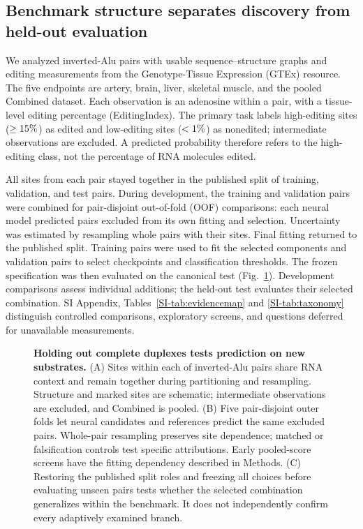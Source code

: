 \documentclass[9pt,twocolumn,twoside]{pnas-new}
\newcommand{\SIref}[1]{\ref*{SI-#1}}
\begin{document}
\subsection*{Benchmark structure separates discovery from held-out evaluation}

We analyzed \NSubstrates{} inverted-Alu pairs with usable sequence--structure graphs and editing measurements from the Genotype-Tissue Expression (GTEx) resource. The five endpoints are artery, brain, liver, skeletal muscle, and the pooled Combined dataset. Each observation is an adenosine within a pair, with a tissue-level editing percentage (EditingIndex). The primary task labels high-editing sites ($\geq15{}\%$) as edited and low-editing sites ($<1{}\%$) as nonedited; intermediate observations are excluded. A predicted probability therefore refers to the high-editing class, not the percentage of RNA molecules edited.

All sites from each pair stayed together in the published split of \NTrainPairs{} training, \NValidationPairs{} validation, and \NTestPairs{} test pairs. During development, the training and validation pairs were combined for pair-disjoint out-of-fold (OOF) comparisons: each neural model predicted pairs excluded from its own fitting and selection. Uncertainty was estimated by resampling whole pairs with their sites. Final fitting returned to the published split. Training pairs were used to fit the selected components and validation pairs to select checkpoints and classification thresholds. The frozen specification was then evaluated on the canonical test (Fig.~\ref{fig:overview}). Development comparisons assess individual additions; the held-out test evaluates their selected combination. SI Appendix, Tables~\SIref{tab:evidencemap} and \SIref{tab:taxonomy} distinguish controlled comparisons, exploratory screens, and questions deferred for unavailable measurements.

\begin{figure}[t!]
\centering

\caption{\textbf{Holding out complete duplexes tests prediction on new substrates.} (A) Sites within each of \NSubstrates{} inverted-Alu pairs share RNA context and remain together during partitioning and resampling. Structure and marked sites are schematic; intermediate observations are excluded, and Combined is pooled. (B) Five pair-disjoint outer folds let neural candidates and references predict the same excluded pairs. Whole-pair resampling preserves site dependence; matched or falsification controls test specific attributions. Early pooled-score screens have the fitting dependency described in Methods. (C) Restoring the published split roles and freezing all choices before evaluating \NTestPairs{} unseen pairs tests whether the selected combination generalizes within the benchmark. It does not independently confirm every adaptively examined branch.}
\label{fig:overview}
\end{figure}
\end{document}
